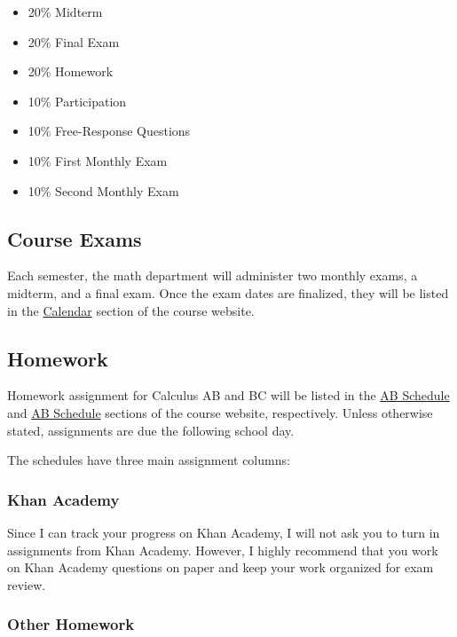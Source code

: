 \documentclass[12pt,fleqn]{article}
\providecommand{\tightlist}{%
  \setlength{\itemsep}{0pt}\setlength{\parskip}{0pt}}
\begin{document}
\begin{itemize}
\tightlist
\item
  20\% Midterm
\item
  20\% Final Exam
\item
  20\% Homework
\item
  10\% Participation
\item
  10\% Free-Response Questions
\item
  10\% First Monthly Exam
\item
  10\% Second Monthly Exam
\end{itemize}

\hypertarget{course-exams}{%
\subsection{Course Exams}\label{course-exams}}

Each semester, the math department will administer two monthly exams, a midterm, and a final exam. Once the exam dates are finalized, they will be listed in the \href{https://ap-calculus.github.io/calendar/2019-2020.html}{Calendar} section of the course website.

\hypertarget{homework}{%
\subsection{Homework}\label{homework}}

Homework assignment for Calculus AB and BC will be listed in the \href{https://ap-calculus.github.io/ab}{AB Schedule} and \href{https://ap-calculus.github.io/bc}{AB Schedule} sections of the course website, respectively. Unless otherwise stated, assignments are due the following school day.

The schedules have three main assignment columns:

\hypertarget{khan-academy}{%
\subsubsection{Khan Academy}\label{khan-academy}}

Since I can track your progress on Khan Academy, I will not ask you to turn in assignments from Khan Academy. However, I highly recommend that you work on Khan Academy questions on paper and keep your work organized for exam review.

\hypertarget{other-homework}{%
\subsubsection{Other Homework}\label{other-homework}}
\end{document}

